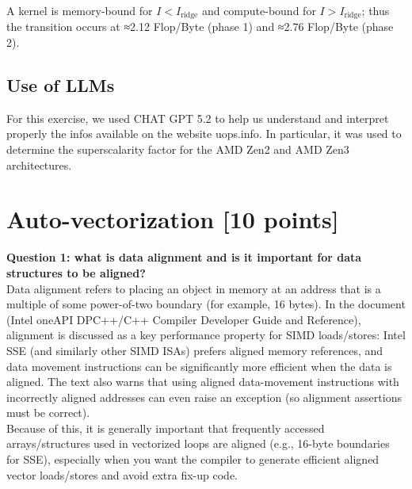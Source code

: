 \documentclass[unicode,10pt,a4paper,oneside,numbers=endperiod,openany]{scrartcl}
\begin{document}
A kernel is memory-bound for 
$I < I_{\text{ridge}}$ and compute-bound for $I > I_{\text{ridge}}$; thus the transition occurs at ≈2.12 Flop/Byte (phase 1) and ≈2.76 Flop/Byte (phase 2).

\subsection{Use of LLMs}
For this exercise, we used CHAT GPT 5.2 to help us understand and interpret properly the infos available on the website uops.info. In particular, it was used to determine the superscalarity factor for the AMD Zen2 and AMD Zen3 architectures.\\


\newpage
\section{Auto-vectorization [10 points]}

\textbf{Question 1: what is data alignment and is it important for data structures to be aligned?}\\
Data alignment refers to placing an object in memory at an address that is a multiple of some power-of-two boundary (for example, 16 bytes). In the document (Intel oneAPI DPC++/C++ Compiler Developer Guide and Reference), alignment is discussed as a key performance property for SIMD loads/stores: Intel SSE (and similarly other SIMD ISAs) prefers aligned memory references, and data movement instructions can be significantly more efficient when the data is aligned. The text also warns that using aligned data-movement instructions with incorrectly aligned addresses can even raise an exception (so alignment assertions must be correct).\\
Because of this, it is generally important that frequently accessed arrays/structures used in vectorized loops are aligned (e.g., 16-byte boundaries for SSE), especially when you want the compiler to generate efficient aligned vector loads/stores and avoid extra fix-up code.\\
\end{document}
